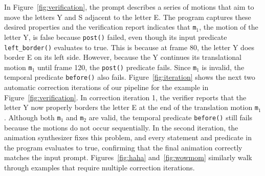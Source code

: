 In Figure~\ref{fig:verification}, the prompt describes a
series of motions that aim to move the letters Y and S adjacent to the letter 
E.
The \dslname{} program captures these desired properties and
the verification report
indicates that \texttt{m}$_1$, the motion of the letter Y, 
is false because \texttt{post()} failed,
even though its input predicate \texttt{left\_border()}
evaluates to true.
This is because 
at frame 80, the letter Y does border
E on its left side.  However, because the Y continues its translational motion
\texttt{m}$_1$ until frame 120, the \texttt{post()} predicate fails.
Since \texttt{m}$_1$ is invalid, the temporal
predicate \texttt{before()} also fails.
Figure~\ref{fig:iteration} shows the next two automatic correction iterations of our
pipeline for the example in
Figure~\ref{fig:verification}.
In correction iteration 1, the verifier reports that the letter Y
now properly borders the letter E at the end of the translation motion \texttt{m}$_1$.  Although
both \texttt{m}$_1$ and \texttt{m}$_2$ are valid, the temporal predicate
\texttt{before()} still fails because the motions do not
occur sequentially.
%
In the second iteration, the animation synthesizer fixes this
problem, and every statement and predicate in the \dslname{}
program evaluates to true, confirming that the final animation
correctly matches the input prompt.
%
Figures~\ref{fig:haha} and~\ref{fig:wowmom} similarly walk through examples that
require multiple correction iterations.



